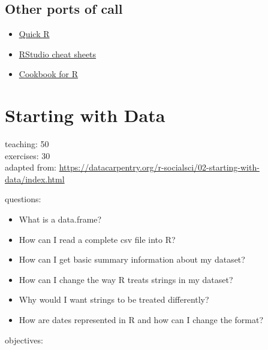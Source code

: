 \documentclass[]{book}
\providecommand{\tightlist}{%
  \setlength{\itemsep}{0pt}\setlength{\parskip}{0pt}}
\begin{document}
\section{Other ports of call}\label{other-ports-of-call}

\begin{itemize}
\tightlist
\item
  \href{http://www.statmethods.net/}{Quick R}
\item
  \href{http://www.rstudio.com/resources/cheatsheets/}{RStudio cheat
  sheets}
\item
  \href{http://www.cookbook-r.com/}{Cookbook for R}
\end{itemize}

\chapter{Starting with Data}\label{starting-with-data}

teaching: 50\\
exercises: 30\\
adapted from:
\url{https://datacarpentry.org/r-socialsci/02-starting-with-data/index.html}

questions:

\begin{itemize}
\tightlist
\item
  What is a data.frame?\\
\item
  How can I read a complete csv file into R?\\
\item
  How can I get basic summary information about my dataset?\\
\item
  How can I change the way R treats strings in my dataset?\\
\item
  Why would I want strings to be treated differently?\\
\item
  How are dates represented in R and how can I change the format?
\end{itemize}

objectives:
\end{document}
